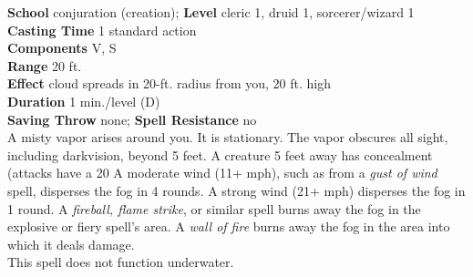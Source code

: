 \textbf{School} conjuration (creation); \textbf{Level} cleric 1, druid 1, sorcerer/wizard 1\\
\textbf{Casting Time} 1 standard action\\
\textbf{Components} V, S\\
\textbf{Range} 20 ft.\\
\textbf{Effect} cloud spreads in 20-ft. radius from you, 20 ft. high\\
\textbf{Duration} 1 min./level (D)\\
\textbf{Saving Throw} none; \textbf{Spell Resistance} no\\
A misty vapor arises around you. It is stationary. The vapor obscures all sight, including darkvision, beyond 5 feet. A creature 5 feet away has concealment (attacks have a 20%
A moderate wind (11+ mph), such as from a \textit{gust of wind }spell, disperses the fog in 4 rounds. A strong wind (21+ mph) disperses the fog in 1 round. A \textit{fireball, flame strike}, or similar spell burns away the fog in the explosive or fiery spell's area. A \textit{wall of fire }burns away the fog in the area into which it deals damage.\\
This spell does not function underwater.\\
